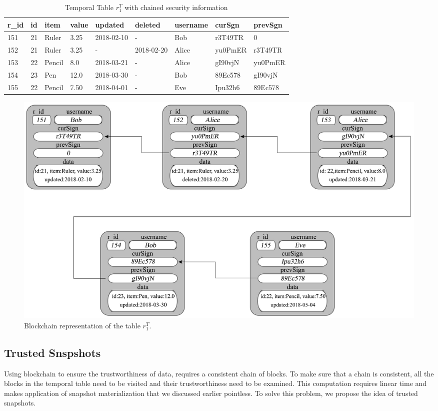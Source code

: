 \begin{center}
\begin{table}
	\centering
	\footnotesize
	\caption{Temporal Table $r_1^T$ with chained security information}
	\label{temporal_blockchain_table}
	\begin{tabular}{p{0.5cm}p{0.5cm}p{1cm}p{0.5cm}p{1.7cm}p{1.7cm}p{1.5cm}p{1.5cm}p{1.5cm}}
		\hline
		r\_id & id & item      & value  & updated  & deleted & username & curSgn & prevSgn \\ \hline
		151& 21 & Ruler    & 3.25  & 2018-02-10  &  - & Bob &r3T49TR & 0\\  
		152& 21 & Ruler    & 3.25  & -  &  2018-02-20 & Alice & yu0PmER & r3T49TR\\
		153& 22 & Pencil    & 8.0  & 2018-03-21  &  - & Alice & gI90vjN & yu0PmER\\
		154& 23 & Pen    & 12.0  & 2018-03-30  &  - & Bob & 89Ec578 & gI90vjN\\
		155& 22 & Pencil & 7.50  & 2018-04-01 & - & Eve & Ipu32h6 & 89Ec578\\ \hline
	\end{tabular}
\end{table} 
\end{center}

\begin{figure}
	\centering
	\includegraphics[width=\textwidth]{figs/temporal_blockchain.pdf}
	\caption{Blockchain representation of the table $r_1^T$.}
	\label{fig:blockchain_representation}
\end{figure}

\subsection{Trusted Snspshots}
Using blockchain to ensure the trustworthiness of data, requires a consistent chain of blocks. To make sure that a chain is consistent, all the blocks in the temporal table need to be visited and their trustworthiness need to be examined. This computation requires linear time and makes application of snapshot materialization that we discussed earlier pointless. To solve this problem, we propose the idea of trusted snapshots.

